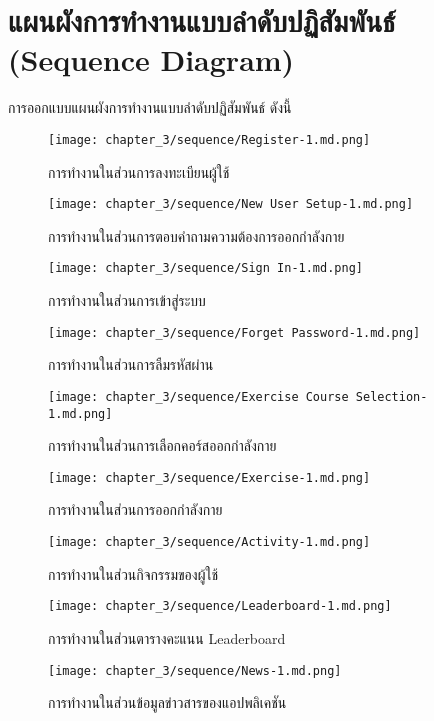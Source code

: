 \section{แผนผังการทำงานแบบลำดับปฏิสัมพันธ์ (Sequence Diagram)}
การออกแบบแผนผังการทำงานแบบลำดับปฏิสัมพันธ์ ดังนี้

\begin{figure}
    \texttt{[image: chapter\_3/sequence/Register-1.md.png]}
    \caption{การทำงานในส่วนการลงทะเบียนผู้ใช้}
\end{figure}

\begin{figure}
    \texttt{[image: chapter\_3/sequence/New User Setup-1.md.png]}
    \caption{การทำงานในส่วนการตอบคำถามความต้องการออกกำลังกาย}
\end{figure}

\begin{figure}
    \texttt{[image: chapter\_3/sequence/Sign In-1.md.png]}
    \caption{การทำงานในส่วนการเข้าสู่ระบบ}
\end{figure}

\begin{figure}
    \texttt{[image: chapter\_3/sequence/Forget Password-1.md.png]}
    \caption{การทำงานในส่วนการลืมรหัสผ่าน}
\end{figure}

\begin{figure}
    \texttt{[image: chapter\_3/sequence/Exercise Course Selection-1.md.png]}
    \caption{การทำงานในส่วนการเลือกคอร์สออกกำลังกาย}
\end{figure}

\begin{figure}
    \texttt{[image: chapter\_3/sequence/Exercise-1.md.png]}
    \caption{การทำงานในส่วนการออกกำลังกาย}
\end{figure}

\begin{figure}
    \texttt{[image: chapter\_3/sequence/Activity-1.md.png]}
    \caption{การทำงานในส่วนกิจกรรมของผู้ใช้}
\end{figure}

\begin{figure}
    \texttt{[image: chapter\_3/sequence/Leaderboard-1.md.png]}
    \caption{การทำงานในส่วนตารางคะแนน Leaderboard}
\end{figure}

\begin{figure}
    \texttt{[image: chapter\_3/sequence/News-1.md.png]}
    \caption{การทำงานในส่วนข้อมูลข่าวสารของแอปพลิเคชัน}
\end{figure}

